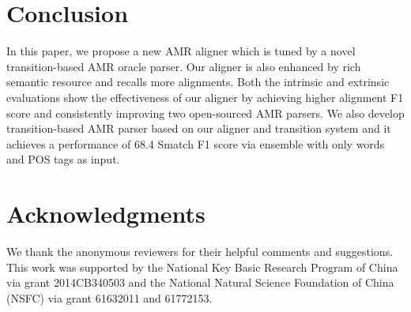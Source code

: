 \documentclass[11pt,a4paper]{article}
\begin{document}
\section{Conclusion}

In this paper, we propose a new AMR aligner which is tuned by
a novel transition-based AMR oracle parser. 
Our aligner is also enhanced by rich semantic resource
and recalls more alignments.
Both the intrinsic and extrinsic evaluations show the effectiveness
of our aligner
by achieving higher alignment F1 score and
consistently improving two open-sourced AMR parsers.
We also develop transition-based AMR parser
based on our aligner and transition system
and it achieves a performance of 68.4 Smatch F1 score
via ensemble
with only words and POS tags as input.

\section*{Acknowledgments}
We thank the anonymous reviewers for their helpful comments and suggestions.
This work was supported by the National Key Basic Research
Program of China via grant 2014CB340503 and the
National Natural Science Foundation of China (NSFC) via
grant 61632011 and 61772153.
\end{document}

